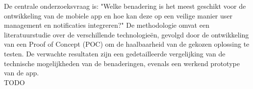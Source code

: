 De centrale onderzoeksvraag is: "Welke benadering is het meest geschikt voor de ontwikkeling van de mobiele app en hoe kan deze op een veilige manier user management en notificaties integreren?" De methodologie omvat een literatuurstudie over de verschillende technologieën, gevolgd door de ontwikkeling van een Proof of Concept (POC) om de haalbaarheid van de gekozen oplossing te testen. De verwachte resultaten zijn een gedetailleerde vergelijking van de technische mogelijkheden van de benaderingen, evenals een werkend prototype van de app. \\

TODO
